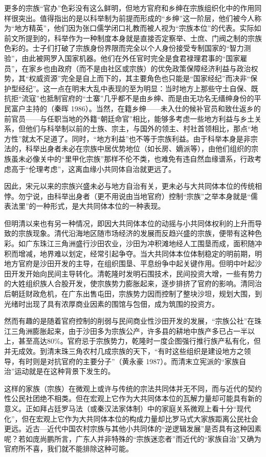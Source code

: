 \documentclass[a4paper,12pt,punct=kaiming,fontset=none]{ctexart}
\begin{document}
更多的宗族“官办”色彩没有这么鲜明，但地方官府和乡绅在宗族组织化中的作用同样很突出。值得指出的是以科举制为前提而形成的“乡绅”这一阶层，他们被今人称为“地方精英”，他们因为张口儒学闭口礼教而被人视为“宗族本位”的代表。实际如前文所提到的，科举作为一种制度本身就是直接否定察举、士庶、门阀之制的宗族色彩的。士子们打破了宗族身份界限而完全以个人身份接受专制国家的“智力测验”，由此被网罗入国家机器。他们在外任官时完全是食君禄理君事的“国家雇员”，在家乡也由政府（而不是由社区或宗族）的优免政策保障经济利益与政治权势，其“权威资源”完全是自上而下的，其主要角色也只能是“国家经纪”而决非“保护型经纪”。这一点在明末大乱中表现的至为明显：当时地方上那些守土自保、既抗拒“流寇”也抵制官府的“土寨”几乎都不是由乡绅、而是由无功名无缙绅身份的平民富户主持的（秦晖 1986）。当然，在籍乡绅——未入仕的候补官员和致仕返乡的前官员——与任职当地的外籍“朝廷命官”相比，能够多考虑一些地方利益与乡土关系，但他们与科举制以前的士族、宗主，与国外的领主、村社首领相比，那点“地方性”就太不足道了。同时，“地方利益”也不等于宗族利益。由于科举本身是非宗法的，科举出身者未必在宗族中居优势地位（如长房、嫡派等），由他们组织的宗族虽未必像关中的“里甲化宗族”那样不伦不类，也难免有违自然血缘谱系，行政考虑高于“伦理考虑”，这离血缘小共同体自治就更远了。

因此，宋元以来的宗族兴盛未必与地方自治有关，更未必与大共同体本位的传统相悖。勿宁说，由科举出身者（更不用说由当地官府）控制“宗族”之举本身就是“儒表法里”的一种形式，是大共同体本位的一种表现。

但明清以来也有另一种情况，即因大共同体本位的动摇与小共同体权利的上升而导致的宗族现象。清代沿海地区随市场经济的发展而反趋兴盛的宗族，便带有这种色彩。如广东珠江三角洲盛行沙田农业，沙田为冲积滩地经人工围垦而成，面积随冲积而增减，地界难以划定，经常引起争夺。当大共同体本位体制稳定的明前期，明地方官府是沙田开发的主导，在组织围垦、平息纷争中起关键作用。但明中叶起沙田开发开始向民间主导转化。清乾隆时发明石围技术，民间投资大增，一些有势力的大姓组织族人合股开发，使宗族势力膨胀起来，逐步排挤了官府的影响。清同治后朝廷财政危机，在广东出售屯田，宗族势力因而控制了整块沙坦，规划大围，到光绪时出现了具有浓厚商业因素的围馆与包佃，成为筑围的投资方。

然而有趣的是随着官府控制的削弱与民间商业性沙田开发的发展，“宗族公社”在珠江三角洲膨胀起来，由于沙田多为宗族公产，许多县的耕地中族产多已占一半以上，甚至高达80\%。官府忌于宗族势力，乾隆时一度企图强行推行族产私有化，但并无成效。到清末珠三角农村几成宗族的天下，“有时这些组织是建设地方之领导，有时则是对抗官府的主要分子”（黄永豪 1987）。而清末立宪派的“家族自治”运动就是在这种背景下发生的。

这样的家族（宗族）在微观上或许与传统的宗法共同体并无不同，而与近代的契约性公民社团绝不相类。但在宏观上它作为大共同体本位的瓦解力量却可能具有新的意义。正如拜占廷罗马法（或秦汉法家体制）中的家庭关系微观上看十分“现代化”，但在宏观上它作为大共同体本位的构成力量却比罗马式大家族距离公民社会更远。近古—近代中国农村宗族与其他小共同体的“逆逻辑发展”是否具有这种因素呢？若如庞尚鹏所言，广东人并非特殊的“宗族迷恋者”而近代的“家族自治”又确为官府所不喜，我们就不能排除这种可能。
\end{document}
